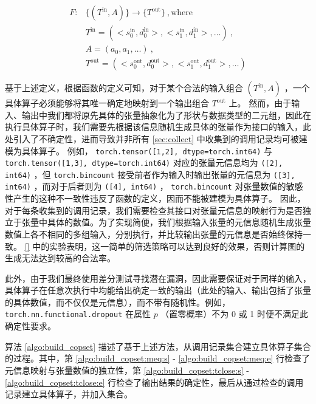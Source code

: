 \begin{equation}
\label{eq:conrete_op}
\begin{aligned}
F: &\{(T^\text{in}, A)\} \rightarrow \{T^\text{out}\} ~, \text{where} \\
&T^\text{in} = (<s^\text{in}_0, d^\text{in}_0>, <s^\text{in}_1, d^\text{in}_1>, \dots) ~, \\
&A = (a_0, a_1, \dots) ~, \\
&T^\text{out} = (<s^\text{out}_0, d^\text{out}_0>, <s^\text{out}_1, d^\text{out}_1>, \dots)
\end{aligned}
\end{equation}



基于上述定义，根据函数的定义可知，对于某个合法的输入组合 $(T^\text{in}, A)$ ，一个具体算子必须能够将其唯一确定地映射到一个输出组合 $T^\text{out}$ 上。
然而，由于输入、输出中我们都将原先具体的张量抽象化为了形状与数据类型的二元组，因此在执行具体算子时，我们需要先根据该信息随机生成具体的张量作为接口的输入，此处引入了不确定性，进而导致并非所有 \ref{sec:collect} 中收集到的调用记录均可被建模为具体算子。
例如， \texttt{torch.tensor([1,2], dtype=torch.int64)} 与 \texttt{torch.tensor([1,3], dtype=torch.int64)} 对应的张量元信息均为 \texttt{([2], int64)} ，但 \texttt{torch.bincount} 接受前者作为输入时输出张量的元信息为 \texttt{([3], int64)} ，而对于后者则为 \texttt{([4], int64)} ， \texttt{torch.bincount} 对张量数值的敏感性产生的这种不一致性违反了函数的定义，因而不能被建模为具体算子。
因此，对于每条收集到的调用记录，我们需要检查其接口对张量元信息的映射行为是否独立于张量中具体的数值。为了实现简便，我们根据输入张量的元信息随机生成张量数值上各不相同的多组输入，分别执行，并比较输出张量的元信息是否始终保持一致。 \ref{} 中的实验表明，这一简单的筛选策略可以达到良好的效果，否则计算图的生成无法达到较高的合法率。

此外，由于我们最终使用差分测试寻找潜在漏洞，因此需要保证对于同样的输入，具体算子在任意次执行中均能给出确定一致的输出（此处的输入、输出包括了张量的具体数值，而不仅仅是元信息），而不带有随机性。例如， \texttt{torch.nn.functional.dropout} 在属性 $p$ （置零概率）不为 0 或 1 时便不满足此确定性要求。

算法 \ref{algo:build_copset} 描述了基于上述方法，从调用记录集合建立具体算子集合的过程。其中，第 \ref{algo:build_copset:meq:s} - \ref{algo:build_copset:meq:e} 行检查了元信息映射与张量数值的独立性，第 \ref{algo:build_copset:tclose:s} - \ref{algo:build_copset:tclose:e} 行检查了输出结果的确定性，最后从通过检查的调用记录建立具体算子，并加入集合。


